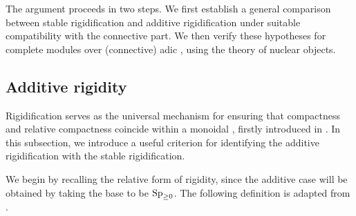 \documentclass[a4paper,10pt, oneside]{amsart}
\begin{document}
 The argument proceeds in two steps. We first establish a general comparison between stable rigidification and additive rigidification under suitable compatibility with the connective part. We then verify these hypotheses for complete modules over (connective) adic \einfrings, using the theory of nuclear objects.
	

\subsection{Additive rigidity}
Rigidification serves as the universal mechanism for ensuring that compactness and relative compactness coincide within a monoidal \infcat, firstly introduced in \cite{arinkin2020stack}. 
In this subsection, we introduce a useful criterion for identifying the additive rigidification with the stable rigidification.

We begin by recalling the relative form of rigidity, since the additive case will be obtained by taking the base to be \(\operatorname{Sp}_{\geq0}\). The following definition is adapted from \cite[Definition 4.36]{ramzi2024locally}.
\end{document}
